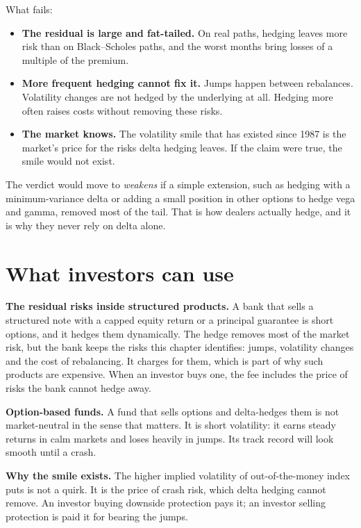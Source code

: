 What fails:

\begin{itemize}
  \item \textbf{The residual is large and fat-tailed.} On real paths, hedging leaves more risk than on Black--Scholes paths, and the worst months bring losses of a multiple of the premium.
  \item \textbf{More frequent hedging cannot fix it.} Jumps happen between rebalances. Volatility changes are not hedged by the underlying at all. Hedging more often raises costs without removing these risks.
  \item \textbf{The market knows.} The volatility smile that has existed since 1987 is the market's price for the risks delta hedging leaves. If the claim were true, the smile would not exist.
\end{itemize}

The verdict would move to \emph{weakens} if a simple extension, such as hedging with a minimum-variance delta or adding a small position in other options to hedge vega and gamma, removed most of the tail. That is how dealers actually hedge, and it is why they never rely on delta alone.

\section{What investors can use}
\label{sec:17-investors}

\textbf{The residual risks inside structured products.} A bank that sells a structured note with a capped equity return or a principal guarantee is short options, and it hedges them dynamically. The hedge removes most of the market risk, but the bank keeps the risks this chapter identifies: jumps, volatility changes and the cost of rebalancing. It charges for them, which is part of why such products are expensive. When an investor buys one, the fee includes the price of risks the bank cannot hedge away.

\textbf{Option-based funds.} A fund that sells options and delta-hedges them is not market-neutral in the sense that matters. It is short volatility: it earns steady returns in calm markets and loses heavily in jumps. Its track record will look smooth until a crash.

\textbf{Why the smile exists.} The higher implied volatility of out-of-the-money index puts is not a quirk. It is the price of crash risk, which delta hedging cannot remove. An investor buying downside protection pays it; an investor selling protection is paid it for bearing the jumps.

